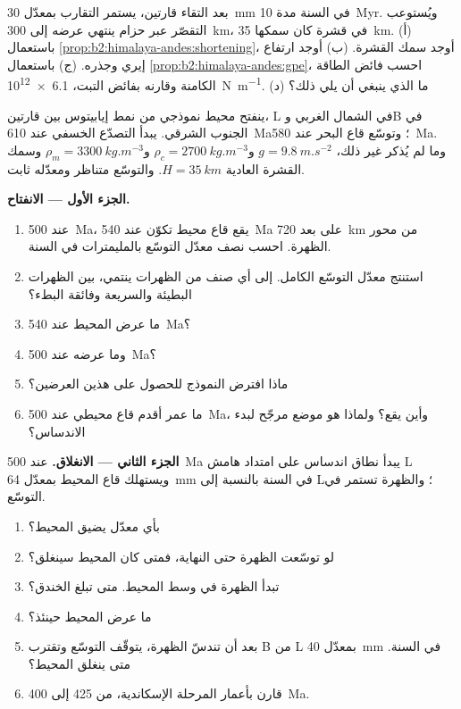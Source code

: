 \begin{exercise}[$\star\star\star$]\label{exo:b2:wilson-cycle:12}
بعد التقاء قارتين، يستمر التقارب بمعدّل \qty{30}{mm} في السنة مدة \qty{10}{Myr}.
ويُستوعب التقصّر عبر حزام ينتهي عرضه إلى \qty{300}{km}، في قشرة كان
سمكها \qty{35}{km}. (أ) باستعمال \cref{prop:b2:himalaya-andes:shortening}، أوجد سمك
القشرة. (ب) أوجد ارتفاع إيري وجذره. (ج) باستعمال \cref{prop:b2:himalaya-andes:gpe}،
احسب فائض الطاقة الكامنة وقارنه بفائض التبت، \qty{6.1e12}{N.m^{-1}}.
(د) ما الذي ينبغي أن يلي ذلك؟
\end{exercise}

\begin{problem}\label{pb:b2:wilson-cycle:1}
ينفتح محيط نموذجي من نمط إيابيتوس بين قارتين، L في الشمال الغربي وB في
الجنوب الشرقي. يبدأ التصدّع الخسفي عند \qty{610}{Ma}؛ وتوسّع قاع البحر عند \qty{580}{Ma}.
وما لم يُذكر غير ذلك، $g = \qty{9.8}{m.s^{-2}}$ و$\rho_c = \qty{2700}{kg.m^{-3}}$ و$\rho_m =
\qty{3300}{kg.m^{-3}}$ وسمك القشرة العادية $H = \qty{35}{km}$. والتوسّع
متناظر ومعدّله ثابت.

\medskip
\noindent\textbf{الجزء الأول --- الانفتاح.}
\begin{enumerate}
\item عند \qty{500}{Ma}، يقع قاع محيط تكوّن عند \qty{540}{Ma} على بعد \qty{720}{km} من محور
الظهرة. احسب نصف معدّل التوسّع بالمليمترات في السنة.
\item استنتج معدّل التوسّع الكامل. إلى أي صنف من الظهرات ينتمي، بين الظهرات البطيئة
والسريعة وفائقة البطء؟
\item ما عرض المحيط عند \qty{540}{Ma}؟
\item وما عرضه عند \qty{500}{Ma}؟
\item ماذا افترض النموذج للحصول على هذين العرضين؟
\item ما عمر أقدم قاع محيطي عند \qty{500}{Ma}، وأين يقع؟ ولماذا هو
موضع مرجّح لبدء الاندساس؟
\end{enumerate}

\noindent\textbf{الجزء الثاني --- الانغلاق.} عند \qty{500}{Ma} يبدأ نطاق اندساس على امتداد
هامش L ويستهلك قاع المحيط بمعدّل \qty{64}{mm} في السنة بالنسبة إلى L؛ والظهرة تستمر في
التوسّع.
\begin{enumerate}[resume]
\item بأي معدّل يضيق المحيط؟
\item لو توسّعت الظهرة حتى النهاية، فمتى كان المحيط سينغلق؟
\item تبدأ الظهرة في وسط المحيط. متى تبلغ الخندق؟
\item ما عرض المحيط حينئذ؟
\item بعد أن تندسّ الظهرة، يتوقّف التوسّع وتقترب B من L بمعدّل \qty{40}{mm} في
السنة. متى ينغلق المحيط؟
\item قارن بأعمار المرحلة الإسكاندية، من 425 إلى \qty{400}{Ma}.
\end{enumerate}


\end{problem}
